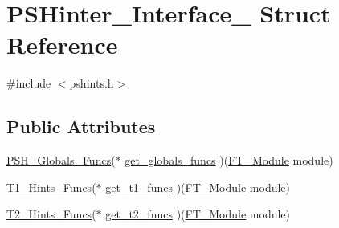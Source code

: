 \hypertarget{struct_p_s_hinter___interface__}{\section{P\-S\-Hinter\-\_\-\-Interface\-\_\- Struct Reference}
\label{struct_p_s_hinter___interface__}
}


{\ttfamily \#include $<$pshints.\-h$>$}

\subsection*{Public Attributes}
\begin{DoxyCompactItemize}
\item 
\hyperlink{pshints_8h_ac83db932351480e591fa91ea38fca5ac}{P\-S\-H\-\_\-\-Globals\-\_\-\-Funcs}($\ast$ \hyperlink{struct_p_s_hinter___interface___a59c68da021c7c0fadcb8bcc8c9a5ba75}{get\-\_\-globals\-\_\-funcs} )(\hyperlink{freetype_8h_a660c1bb333747abacdc433b7d73ca59b}{F\-T\-\_\-\-Module} module)
\item 
\hyperlink{pshints_8h_a58382619ef239247c0769c04dcd6e4d8}{T1\-\_\-\-Hints\-\_\-\-Funcs}($\ast$ \hyperlink{struct_p_s_hinter___interface___a9b5405d780efc53df42c3a3e4f8e844b}{get\-\_\-t1\-\_\-funcs} )(\hyperlink{freetype_8h_a660c1bb333747abacdc433b7d73ca59b}{F\-T\-\_\-\-Module} module)
\item 
\hyperlink{pshints_8h_a0aa727e5db76dbf6b39051afd1ce1536}{T2\-\_\-\-Hints\-\_\-\-Funcs}($\ast$ \hyperlink{struct_p_s_hinter___interface___a7ecbd2179450d996111ec51e8d50ecc3}{get\-\_\-t2\-\_\-funcs} )(\hyperlink{freetype_8h_a660c1bb333747abacdc433b7d73ca59b}{F\-T\-\_\-\-Module} module)
\end{DoxyCompactItemize}


